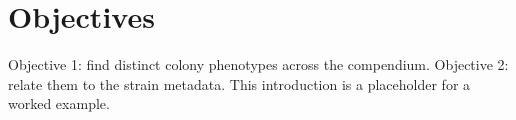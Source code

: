\section{Objectives}
Objective 1: find distinct colony phenotypes across the compendium.
Objective 2: relate them to the strain metadata.
This introduction is a placeholder for a worked example.
